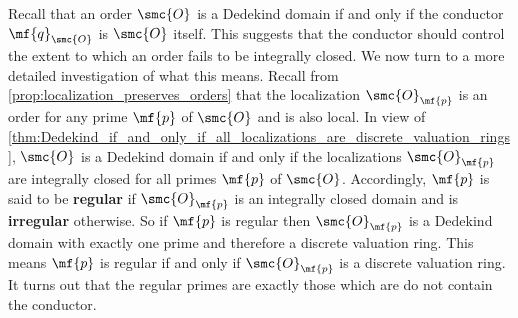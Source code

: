 \documentclass[12pt]{article}
\begin{document}
      Recall that an order \(\smc{O}\) is a Dedekind domain if and only if the conductor \(\mf{q}_{\smc{O}}\) is \(\smc{O}\) itself. This suggests that the conductor should control the extent to which an order fails to be integrally closed. We now turn to a more detailed investigation of what this means. Recall from \cref{prop:localization_preserves_orders} that the localization \(\smc{O}_{\mf{p}}\) is an order for any prime \(\mf{p}\) of \(\smc{O}\) and is also local. In view of \cref{thm:Dedekind_if_and_only_if_all_localizations_are_discrete_valuation_rings}, \(\smc{O}\) is a Dedekind domain if and only if the localizations \(\smc{O}_{\mf{p}}\) are integrally closed for all primes \(\mf{p}\) of \(\smc{O}\). Accordingly, \(\mf{p}\) is said to be \textbf{regular} if \(\smc{O}_{\mf{p}}\) is an integrally closed domain and is \textbf{irregular} otherwise. So if \(\mf{p}\) is regular then \(\smc{O}_{\mf{p}}\) is a Dedekind domain with exactly one prime and therefore a discrete valuation ring. This means \(\mf{p}\) is regular if and only if \(\smc{O}_{\mf{p}}\) is a discrete valuation ring. It turns out that the regular primes are exactly those which are do not contain the conductor.
\end{document}
